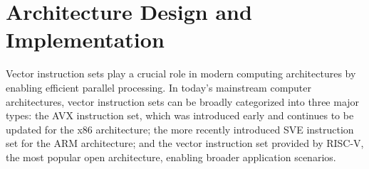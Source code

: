 \documentclass[conference]{IEEEtran}
\begin{document}



\section{Architecture Design and Implementation}
Vector instruction sets play a crucial role in modern computing architectures by 
enabling efficient parallel processing. In today's mainstream computer architectures, 
vector instruction sets can be broadly categorized into three major types: 
the AVX instruction set, which was introduced early and continues to be updated 
for the x86 architecture; the more recently introduced SVE instruction set for the ARM architecture; 
and the vector instruction set provided by RISC-V, the most popular open architecture, 
enabling broader application scenarios.
\end{document}
